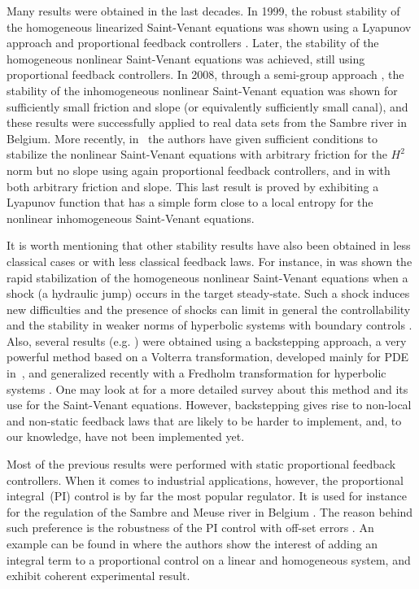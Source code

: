 \documentclass[JEP,XML,SOM,Unicode]{cedram}
\theoremstyle{definition}
\begin{document}
Many results were obtained in the last decades.
In 1999, the robust stability of the homogeneous linearized Saint-Venant equations was shown using a Lyapunov approach and proportional feedback controllers \cite{coron1999}.
Later, the stability of the homogeneous nonlinear Saint-Venant equations was achieved, still using proportional feedback controllers.
In 2008, through a semi-group approach \cite{dos2008}, the stability of the inhomogeneous nonlinear Saint-Venant equation was shown for sufficiently small friction and slope (or equivalently sufficiently small canal), and these results were successfully applied to real data sets from the Sambre river in Belgium.
More recently, in~\cite{BC2017} the authors have given sufficient conditions to stabilize the nonlinear Saint-Venant equations with arbitrary friction for the $H^{2}$ norm but no slope using again proportional feedback controllers,
and in \cite{HS} with both arbitrary friction and slope.
This last result is proved by exhibiting {a Lyapunov function that has a simple form close to a local entropy} for the nonlinear inhomogeneous Saint-Venant equations.

It is worth mentioning that other stability results have also been obtained in less classical cases or with less classical feedback laws.
For instance, in \cite{stvenantjump} was shown the rapid stabilization of the homogeneous nonlinear Saint-Venant equations when a shock (\eg a hydraulic jump) occurs in the target steady-state.
Such {a} shock indu\-ces new difficulties and the presence of shocks can limit in general the controllability and the stability in weaker norms of hyperbolic systems
with boundary controls
\hbox{\cite{ABG,BG}}.
Also, several results (e.g.
\cite{CVBK})
were obtained using a backstepping approach, a very powerful method based on a Volterra transformation, developed mainly for PDE in~\cite{KrsticBook},
and generalized recently with a Fredholm transformation for hyperbolic systems \hbox{\cite{CoronFredholm,Zhang,Zhang2}}.
One may look at \cite{HS} for a more detailed survey about this method and its use for the Saint-Venant equations.
However, backstepping gives rise to non-local and non-static feedback laws that are likely to be harder to implement, and, to our knowledge, have not been implemented yet.

Most of the previous results were performed with static proportional feedback controllers. When it comes to industrial applications, however, the proportional integral~(PI) control is by far the most popular regulator.
It is used for instance for the regulation of the Sambre and Meuse river in Belgium \cite[Chap.\,8]{BastinCoron1D}.
The reason behind such preference is the robustness of the PI control with off-set errors \cite[Chap.\,11.3]{Astrom2}. {An example can be found in \cite{DosSantosBastinCoron}
where the authors show the interest of adding an integral term to a proportional control on a linear and homogeneous system, and exhibit coherent experimental result.}\enlargethispage{.5\baselineskip}%
\end{document}
